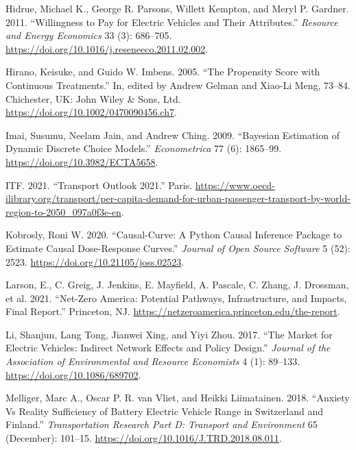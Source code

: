 \documentclass[
  letterpaper,
  DIV=11,
  numbers=noendperiod]{scrartcl}
\newlength{\cslhangindent}
\newlength{\cslentryspacingunit} %
\newenvironment{CSLReferences}[2] %
 {%
  \setlength{\parindent}{0pt}
  \ifodd #1
  \let\oldpar\par
  \def\par{\hangindent=\cslhangindent\oldpar}
  \fi
  \setlength{\parskip}{#2\cslentryspacingunit}
 }%
 {}
\begin{document}
\begin{CSLReferences}{1}{0}
\leavevmode{}%
Hidrue, Michael K., George R. Parsons, Willett Kempton, and Meryl P.
Gardner. 2011. {``Willingness to Pay for Electric Vehicles and Their
Attributes.''} \emph{Resource and Energy Economics} 33 (3): 686--705.
\url{https://doi.org/10.1016/j.reseneeco.2011.02.002}.

\leavevmode{}%
Hirano, Keisuke, and Guido W. Imbens. 2005. {``The Propensity Score with
Continuous Treatments.''} In, edited by Andrew Gelman and Xiao-Li Meng,
73--84. Chichester, UK: John Wiley \& Sons, Ltd.
\url{https://doi.org/10.1002/0470090456.ch7}.

\leavevmode{}%
Imai, Susumu, Neelam Jain, and Andrew Ching. 2009. {``Bayesian
Estimation of Dynamic Discrete Choice Models.''} \emph{Econometrica} 77
(6): 1865--99. \url{https://doi.org/10.3982/ECTA5658}.

\leavevmode{}%
ITF. 2021. {``Transport Outlook 2021.''} Paris.
\url{https://www.oecd-ilibrary.org/transport/per-capita-demand-for-urban-passenger-transport-by-world-region-to-2050_097a0f3e-en}.

\leavevmode{}%
Kobrosly, Roni W. 2020. {``Causal-Curve: A Python Causal Inference
Package to Estimate Causal Dose-Response Curves.''} \emph{Journal of
Open Source Software} 5 (52): 2523.
\url{https://doi.org/10.21105/joss.02523}.

\leavevmode{}%
Larson, E., C. Greig, J. Jenkins, E. Mayfield, A. Pascale, C. Zhang, J.
Drossman, et al. 2021. {``Net-Zero America: Potential Pathways,
Infrastructure, and Impacts, Final Report.''} Princeton, NJ.
\url{https://netzeroamerica.princeton.edu/the-report}.

\leavevmode{}%
Li, Shanjun, Lang Tong, Jianwei Xing, and Yiyi Zhou. 2017. {``The Market
for Electric Vehicles: Indirect Network Effects and Policy Design.''}
\emph{Journal of the Association of Environmental and Resource
Economists} 4 (1): 89--133. \url{https://doi.org/10.1086/689702}.

\leavevmode{}%
Melliger, Marc A., Oscar P. R. van Vliet, and Heikki Liimatainen. 2018.
{``Anxiety Vs Reality {\textendash} Sufficiency of Battery Electric
Vehicle Range in Switzerland and Finland.''} \emph{Transportation
Research Part D: Transport and Environment} 65 (December): 101--15.
\url{https://doi.org/10.1016/J.TRD.2018.08.011}.


\end{CSLReferences}
\end{document}
